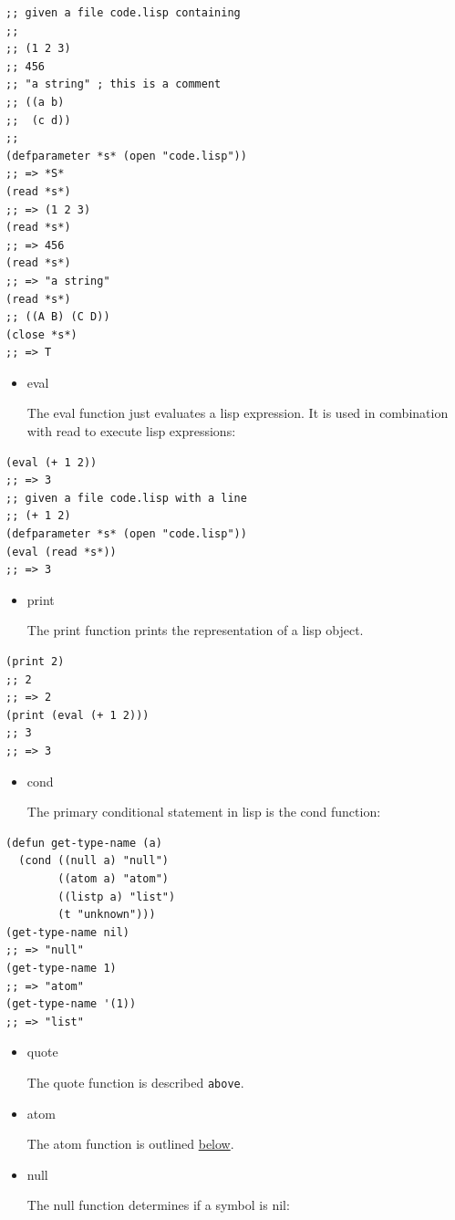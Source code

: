 \documentclass[11pt]{article}
\begin{document}
\begin{verbatim}
;; given a file code.lisp containing
;;
;; (1 2 3)
;; 456
;; "a string" ; this is a comment
;; ((a b)
;;  (c d))
;;
(defparameter *s* (open "code.lisp"))
;; => *S*
(read *s*)
;; => (1 2 3)
(read *s*)
;; => 456
(read *s*)
;; => "a string"
(read *s*)
;; ((A B) (C D))
(close *s*)
;; => T
\end{verbatim}

\begin{itemize}
\item eval

The eval function just evaluates a lisp expression. It is used in
combination with read to execute lisp expressions:
\end{itemize}

\begin{verbatim}
(eval (+ 1 2))
;; => 3
;; given a file code.lisp with a line
;; (+ 1 2)
(defparameter *s* (open "code.lisp"))
(eval (read *s*))
;; => 3
\end{verbatim}

\begin{itemize}
\item print

The print function prints the representation of a lisp object.
\end{itemize}

\begin{verbatim}
(print 2)
;; 2
;; => 2
(print (eval (+ 1 2)))
;; 3
;; => 3
\end{verbatim}

\begin{itemize}
\item cond

The primary conditional statement in lisp is the cond function:
\end{itemize}

\begin{verbatim}
(defun get-type-name (a)
  (cond ((null a) "null")
        ((atom a) "atom")
        ((listp a) "list")
        (t "unknown")))
(get-type-name nil)
;; => "null"
(get-type-name 1)
;; => "atom"
(get-type-name '(1))
;; => "list"
\end{verbatim}

\begin{itemize}
\item quote

The quote function is described \texttt{above}.

\item atom

The atom function is outlined \hyperref[sec-5-1]{below}.

\item null

The null function determines if a symbol is nil:
\end{itemize}
\end{document}
